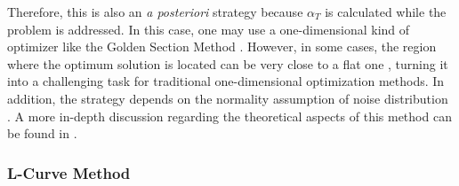 				Therefore, this is also an \textit{a posteriori} strategy because $\alpha_T$ is calculated while the problem is addressed. In this case, one may use a one-dimensional kind of optimizer like the Golden Section Method \citep{rao2019introduction}. However, in some cases, the region where the optimum solution is located can be very close to a flat one \citep{varah1983pitfalls}, turning it into a challenging task for traditional one-dimensional optimization methods. In addition, the strategy depends on the normality assumption of noise distribution \citep{gilmore2009comparison}. A more in-depth discussion regarding the theoretical aspects of this method can be found in \citep{golub1979generalized}.
					
			\subsubsection{L-Curve Method}\label{chap:methods:linear:tikhonov:lcurve}
					
